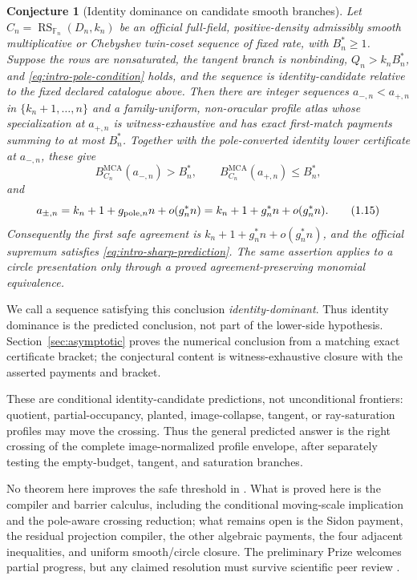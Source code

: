 \documentclass[a4paper,11pt]{amsart}
\newtheorem{conjecture}[theorem]{Conjecture}
\theoremstyle{remark}
\DeclareMathOperator{\RS}{RS}
\DeclareMathOperator{\MCA}{MCA}
\newcommand{\F}{\mathbb F}
\begin{document}
\begin{conjecture}[Identity dominance on candidate smooth branches]
\label{conj:identity-frontier}
Let \(C_n=\RS_{\F_n}(D_n,k_n)\) be an official full-field, positive-density
admissibly smooth multiplicative or Chebyshev twin-coset sequence of fixed
rate, with \(B_n^*\ge1\).  Suppose the rows are nonsaturated, the tangent
branch is nonbinding, \(Q_n>k_nB_n^*\), and
\eqref{eq:intro-pole-condition} holds, and the sequence is
identity-candidate relative to the fixed declared catalogue above.  Then there
are integer sequences
\(a_{-,n}<a_{+,n}\) in \(\{k_n+1,\ldots,n\}\) and a family-uniform,
non-oracular profile atlas whose specialization at \(a_{+,n}\) is
witness-exhaustive and has exact first-match payments summing to at most
\(B_n^*\).  Together with the pole-converted identity lower certificate at
\(a_{-,n}\), these give
\[
 B_{C_n}^{\MCA}(a_{-,n})>B_n^*,\qquad
 B_{C_n}^{\MCA}(a_{+,n})\le B_n^*,                 \tag{1.14}\label{eq:intro-exact-bracket}
\]
and
\[
 a_{\pm,n}=k_n+1+g_{{\rm pole},n}n+o(g_n^*n)
 =k_n+1+g_n^*n+o(g_n^*n).                         \tag{1.15}\label{eq:intro-bracket-location}
\]
Consequently the first safe agreement is
\(k_n+1+g_n^*n+o(g_n^*n)\), and the official supremum satisfies
\eqref{eq:intro-sharp-prediction}.  The same assertion applies to a circle
presentation only through a proved agreement-preserving monomial equivalence.
\end{conjecture}
We call a sequence satisfying this conclusion \emph{identity-dominant}.
Thus identity dominance is the predicted conclusion, not part of the
lower-side hypothesis.  Section~\ref{sec:asymptotic} proves the numerical
conclusion from a matching exact certificate bracket; the conjectural
content is witness-exhaustive closure with the asserted payments and bracket.

These are conditional identity-candidate predictions, not unconditional
frontiers: quotient, partial-occupancy, planted, image-collapse, tangent,
or ray-saturation profiles may move the crossing.  Thus the general predicted
answer is the right crossing of the complete image-normalized profile
envelope, after separately testing the empty-budget, tangent, and saturation
branches.

No theorem here improves the safe threshold in \cite{ChoShortening}.  What is
proved here is the compiler and barrier calculus, including the conditional
moving-scale implication and the pole-aware crossing reduction; what remains open
is the Sidon payment, the residual projection compiler, the other algebraic
payments, the four adjacent inequalities, and uniform smooth/circle closure.
The preliminary Prize welcomes partial progress, but any claimed resolution
must survive scientific peer review \cite{ProximityPrize}.
\end{document}
